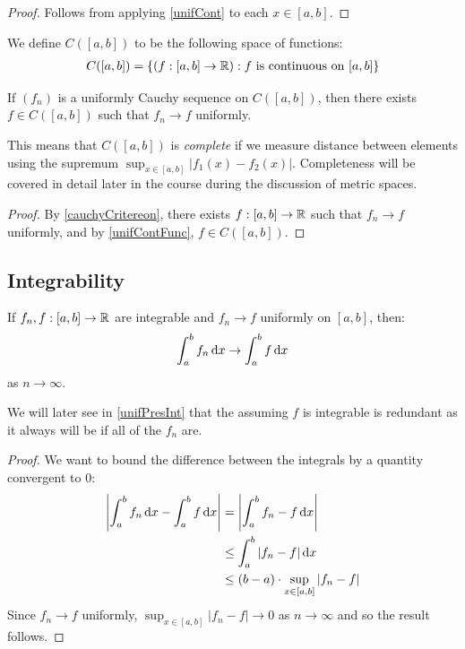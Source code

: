 \documentclass[../main.tex]{subfiles}
\begin{document}
\begin{proof}
  Follows from applying \cref{unifCont} to each $x \in [a, b]$.
\end{proof}
\begin{remark}[Notation]
  We define $C([a, b])$ to be the following space of functions:
  \begin{align*}
    C([a, b]) = \{(f: [a, b] \to \mathbb{R}): f \text{ is continuous on $[a, b]$}\}
  \end{align*}
\end{remark}
\begin{corollary}
  If $(f_n)$ is a uniformly Cauchy sequence on $C([a, b])$, then there exists $f \in C([a, b])$ such that $f_n \to f$ uniformly. \label{cabClosed}
\end{corollary}
\begin{remark}
  This means that $C([a, b])$ is \textit{complete} if we measure distance between elements using the supremum $\sup_{x \in [a, b]} |f_1(x) - f_2(x)|$.
  Completeness will be covered in detail later in the course during the discussion of metric spaces.
\end{remark}
\begin{proof}
  By \cref{cauchyCritereon}, there exists $f: [a, b] \to \mathbb{R}$ such that $f_n \to f$ uniformly, and by \cref{unifContFunc}, $f \in C([a, b])$.
\end{proof}
\subsection{Integrability}
\begin{theorem}
  If $f_n, f: [a, b] \to \mathbb{R}$ are integrable and $f_n \to f$ uniformly on $[a, b]$, then: \label{unifIntegralValue}
  \[
    \int_{a}^{b} f_n \d{x} \to \int_{a}^{b} f \d{x}
  \]
  as $n \to \infty$.
\end{theorem}
\begin{remark}
  We will later see in \cref{unifPresInt} that the assuming $f$ is integrable is redundant as it always will be if all of the $f_n$ are.
\end{remark}
\begin{proof}
  We want to bound the difference between the integrals by a quantity convergent to 0:
  \begin{align*}
    \abs{\int_{a}^{b} f_n \d{x} - \int_{a}^{b} f \d{x}} &= \abs{\int_{a}^{b} f_n - f \d{x}} \\
                                                        &\leq \int_{a}^{b} |f_n - f| \d{x} \\
                                                        &\leq (b -  a) \cdot \sup_{x \in [a, b]} |f_n - f|
  \end{align*}
  Since $f_n \to f$ uniformly, $\sup_{x \in [a, b]} |f_n - f| \to 0$ as $n \to \infty$ and so the result follows.
\end{proof}
\end{document}
